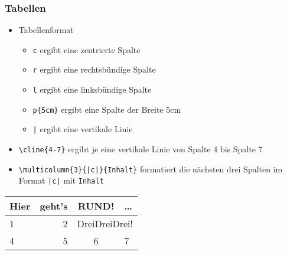 \begin{frame}[fragile]
  \frametitle{Tabellen}

  \onslide<+->

  \begin{itemize}
  \item<+-> Tabellenformat
    \onslide<+->
    \begin{itemize}
    \item \lstinline|c| ergibt eine zentrierte Spalte
    \item \lstinline|r| ergibt eine rechtsbündige Spalte
    \item \lstinline|l| ergibt eine linksbündige Spalte
    \item \lstinline!p{5cm}! ergibt eine Spalte der Breite 5cm
    \item \lstinline!|! ergibt eine vertikale Linie
    \end{itemize}
  \item<+-> \lstinline!\cline{4-7}! ergibt je eine vertikale Linie von Spalte 4 bis Spalte 7
  \item<+-> \lstinline!\multicolumn{3}{|c|}{Inhalt}! formatiert die nächsten drei Spalten
    im Format \lstinline!|c|! mit \lstinline!Inhalt!
  \end{itemize}

  \onslide<+->

  \medskip

  \begin{center}
    \begin{tabular}{|lr|c|p{2cm}|}
      Hier & geht's & RUND! & \dots \\
      \hline\hline
      1    &      2 & \multicolumn{2}{c}{ DreiDreiDrei! } \\
      \cline{2-3}
      4    &      5 & 6     & 7
    \end{tabular}
  \end{center}

\end{frame}

